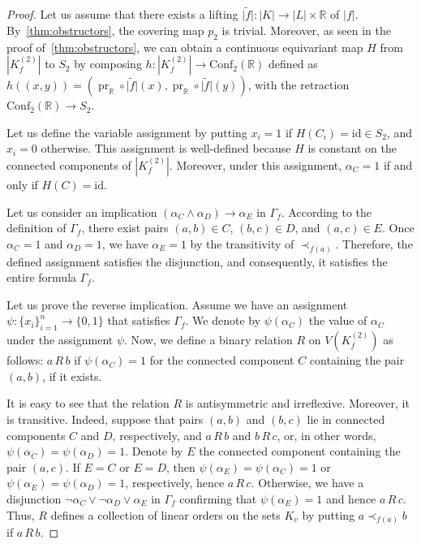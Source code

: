 \documentclass[a4paper,12pt,reqno,oneside]{amsart}
\theoremstyle{plain}
\theoremstyle{definition}
\theoremstyle{plain}
\newcommand{\from}{\colon}
\newcommand{\wt}[1]{\widetilde{#1}}
\newcommand{\Conf}{\mathrm{Conf}}
\newcommand{\id}{\mathrm{id}}
\newcommand{\R}{\mathbb{R}}
\DeclareMathOperator{\pr}{pr}
\begin{document}
\begin{proof}
  Let us assume that there exists a lifting $\wt{|f|} \from |K| \to |L| \times \R$ of
  $|f|$. By~\cref{thm:obstructors}, the covering map $p_2$ is trivial. Moreover, as seen in the
  proof of~\cref{thm:obstructors}, we can obtain a continuous equivariant map $H$ from $|K^{(2)}_f|$
  to $S_2$ by composing $h \from |K^{(2)}_f| \to \Conf_2(\R)$ defined as $h((x, y)) = \left(\pr_\R
    \circ \wt{|f|}(x), \pr_\R \circ \wt{|f|}(y)\right)$, with the retraction $\Conf_2(\R) \to
  S_2$.

  Let us define the variable assignment by putting $x_i = 1$ if $H(C_{i}) = \id \in S_2$, and
  $x_{i} = 0$ otherwise. This assignment is well-defined because $H$ is constant on the connected
  components of $|K^{(2)}_f|$. Moreover, under this assignment, $\alpha_{C} = 1$ if and
  only if $H(C) = \id$.

  Let us consider an implication $(\alpha_C \land \alpha_D) \to \alpha_E$ in $\Gamma_f$. According
  to the definition of $\Gamma_f$, there exist pairs $(a, b) \in C$, $(b, c) \in D$, and
  $(a, c) \in E$. Once $\alpha_C = 1$ and $\alpha_D = 1$, we have $\alpha_E = 1$ by the transitivity
  of $\prec_{f(a)}$. Therefore, the defined assignment satisfies the disjunction, and consequently,
  it satisfies the entire formula $\Gamma_f$.

  Let us prove the reverse implication. Assume we have an assignment
  $\psi \from \{ x_{i} \}_{i=1}^{n} \to \{0, 1\}$ that satisfies $\Gamma_f$. We denote by
  $\psi(\alpha_C)$ the value of $\alpha_C$ under the assignment $\psi$. Now, we define a binary
  relation $R$ on $V(K^{(2)}_f)$ as follows: $a\, R\, b$ if $\psi(\alpha_C) = 1$ for the connected
  component $C$ containing the pair $(a, b)$, if it exists.

  It is easy to see that the relation $R$ is antisymmetric and irreflexive. Moreover, it is
  transitive. Indeed, suppose that pairs $(a, b)$ and $(b, c)$ lie in connected components $C$ and
  $D$, respectively, and $a\, R\, b$ and $b\, R\, c$, or, in other words,
  $\psi(\alpha_C) = \psi(\alpha_D) = 1$. Denote by $E$ the connected component containing the pair
  $(a, c)$. If $E = C$ or $E = D$, then $\psi(\alpha_E) = \psi(\alpha_C) = 1$ or
  $\psi(\alpha_E) = \psi(\alpha_D) = 1$, respectively, hence $a\, R\, c$. Otherwise, we have a disjunction
  $\neg \alpha_C \lor \neg \alpha_D \lor \alpha_E$ in $\Gamma_f$ confirming that $\psi(\alpha_E) = 1$ and
  hence $a\, R\, c$.  Thus, $R$ defines a collection of linear orders on the sets $K_v$ by putting
  $a \prec_{f(a)} b$ if $a\, R\, b$.


\end{proof}
\end{document}

